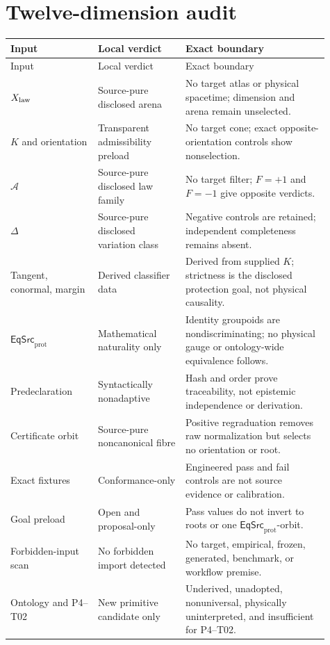 \documentclass[11pt]{article}
\newcommand{\EqSrc}{\mathsf{EqSrc}_{\mathrm{prot}}}
\begin{document}
\section{Twelve-dimension audit}

\begin{longtable}{P{0.25\linewidth}P{0.25\linewidth}P{0.41\linewidth}}
\toprule
Input & Local verdict & Exact boundary \\
\midrule
\endfirsthead
\toprule
Input & Local verdict & Exact boundary \\
\midrule
\endhead
\(X_{\rm law}\) & Source-pure disclosed arena & No target atlas or physical spacetime; dimension and arena remain unselected. \\
\(K\) and orientation & Transparent admissibility preload & No target cone; exact opposite-orientation controls show nonselection. \\
\(\mathcal A\) & Source-pure disclosed law family & No target filter; \(F=+1\) and \(F=-1\) give opposite verdicts. \\
\(\Delta\) & Source-pure disclosed variation class & Negative controls are retained; independent completeness remains absent. \\
Tangent, conormal, margin & Derived classifier data & Derived from supplied \(K\); strictness is the disclosed protection goal, not physical causality. \\
\(\EqSrc\) & Mathematical naturality only & Identity groupoids are nondiscriminating; no physical gauge or ontology-wide equivalence follows. \\
Predeclaration & Syntactically nonadaptive & Hash and order prove traceability, not epistemic independence or derivation. \\
Certificate orbit & Source-pure noncanonical fibre & Positive regraduation removes raw normalization but selects no orientation or root. \\
Exact fixtures & Conformance-only & Engineered pass and fail controls are not source evidence or calibration. \\
Goal preload & Open and proposal-only & Pass values do not invert to roots or one \(\EqSrc\)-orbit. \\
Forbidden-input scan & No forbidden import detected & No target, empirical, frozen, generated, benchmark, or workflow premise. \\
Ontology and P4--T02 & New primitive candidate only & Underived, unadopted, nonuniversal, physically uninterpreted, and insufficient for P4--T02. \\
\bottomrule
\end{longtable}
\end{document}
